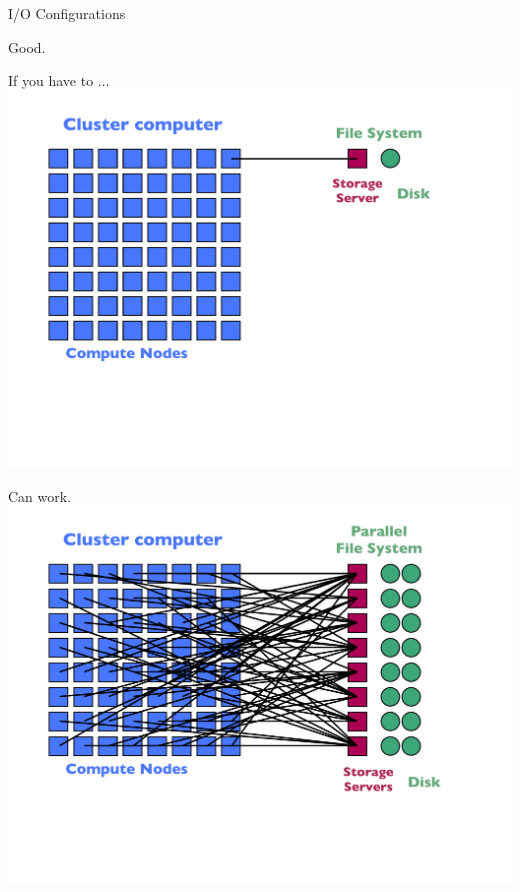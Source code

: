 \begin{frame}{I/O Configurations}
\begin{minipage}{0.32\textwidth}
\begin{block}{Good.}
    \end{block}
  \end{minipage}\hspace{1ex}
  \begin{minipage}{0.32\textwidth}
    \begin{block}{If you have to $\ldots$}
      \includegraphics[trim=0 140 30 40,clip,width=1\textwidth]{../common/pics/hardware/ParallelHardware15.pdf}
    \end{block}
  \end{minipage}
  \begin{minipage}{0.32\textwidth}
    \begin{block}{Can work.}
      \includegraphics[trim=0 140 30 40,clip,width=1\textwidth]{../common/pics/hardware/ParallelHardware18.pdf}

\end{block}
\end{minipage}
\end{frame}

